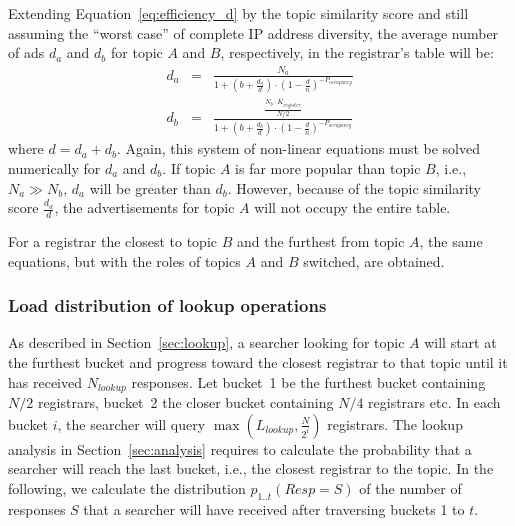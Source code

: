 Extending Equation~\ref{eq:efficiency_d} by the topic similarity score and still assuming the ``worst case'' of complete IP address diversity, the average number of ads $d_a$ and $d_b$ for topic $A$ and $B$, respectively, in the registrar's table will be:
\begin{eqnarray}
d_a & = & \frac{N_a}{1 + (b + \frac{d_a}{d}) \cdot (1 - \frac{d}{n})^{-P_{occupancy}}}\label{eq:da_fair}\\
d_b & = & \frac{\frac{N_b\cdot K_{register}}{N/2}}{1 + (b + \frac{d_b}{d}) \cdot (1 - \frac{d}{n})^{-P_{occupancy}}}
\end{eqnarray}
where $d = d_a + d_b$. Again, this system of non-linear equations must be solved numerically for $d_a$ and $d_b$.
If topic $A$ is far more popular than topic $B$, i.e., $N_a \gg N_b$, $d_a$ will be greater than $d_b$. However, because of the topic similarity score $\frac{d_a}{d}$, the advertisements for topic $A$ will not occupy the entire table.

For a registrar the closest to topic $B$ and the furthest from topic $A$, the same equations, but with the roles of topics $A$ and $B$ switched, are obtained.

\subsubsection{Load distribution of lookup operations}

As described in Section~\ref{sec:lookup}, a searcher looking for topic $A$ will start at the furthest bucket and progress toward the closest registrar to that topic until it has received $N_{lookup}$ responses.
Let bucket~1 be the furthest bucket containing $N/2$ registrars, bucket~2 the closer bucket containing $N/4$ registrars etc. In each bucket $i$, the searcher will query $\max(L_{lookup}, \frac{N}{2^i})$ registrars.
The lookup analysis in Section~\ref{sec:analysis} requires to calculate the probability that a searcher will reach the last bucket, i.e., the closest registrar to the topic. In the following, we calculate the distribution $p_{1..t}(Resp=S)$ of the number of responses $S$ that a searcher will have received after traversing buckets 1 to $t$.

